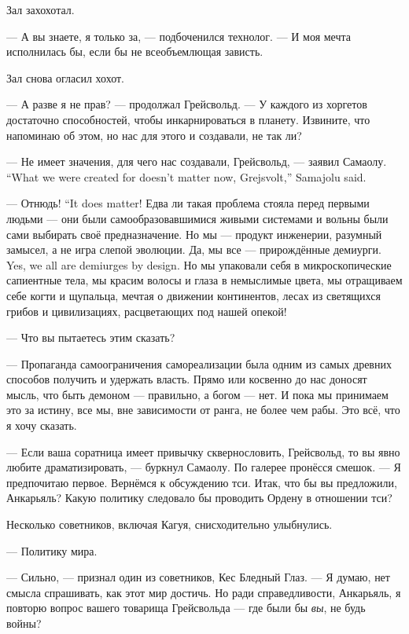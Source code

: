 Зал захохотал.

--- А вы знаете, я только за, --- подбоченился технолог.
--- И моя мечта исполнилась бы, если бы не всеобъемлющая зависть.

Зал снова огласил хохот.

--- А разве я не прав? --- продолжал Грейсвольд.
--- У каждого из хоргетов достаточно способностей, чтобы инкарнироваться в планету.
Извините, что напоминаю об этом, но нас для этого и создавали, не так ли?

{--- Не имеет значения, для чего нас создавали, Грейсвольд, --- заявил Самаолу.}
{``What we were created for doesn't matter now, Grejsvolt,'' Samajolu said.}

{--- Отнюдь!}
{``It does matter!}
Едва ли такая проблема стояла перед первыми людьми --- они были самообразовавшимися живыми системами и вольны были сами выбирать своё предназначение.
Но мы --- продукт инженерии, разумный замысел, а не игра слепой эволюции.
{Да, мы все --- прирождённые демиурги.}
{Yes, we all are demiurges by design.}
Но мы упаковали себя в микроскопические сапиентные тела, мы красим волосы и глаза в немыслимые цвета, мы отращиваем себе когти и щупальца, мечтая о движении континентов, лесах из светящихся грибов и цивилизациях, расцветающих под нашей опекой!

--- Что вы пытаетесь этим сказать?

--- Пропаганда самоограничения самореализации была одним из самых древних способов получить и удержать власть.
Прямо или косвенно до нас доносят мысль, что быть демоном --- правильно, а богом --- нет.
И пока мы принимаем это за истину, все мы, вне зависимости от ранга, не более чем рабы.
Это всё, что я хочу сказать.

--- Если ваша соратница имеет привычку сквернословить, Грейсвольд, то вы явно любите драматизировать, --- буркнул Самаолу.
По галерее пронёсся смешок.
--- Я предпочитаю первое.
Вернёмся к обсуждению тси.
Итак, что бы вы предложили, Анкарьяль?
Какую политику следовало бы проводить Ордену в отношении тси?

Несколько советников, включая Кагуя, снисходительно улыбнулись.

--- Политику мира.

--- Сильно, --- признал один из советников, Кес Бледный Глаз.
--- Я думаю, нет смысла спрашивать, как этот мир достичь.
Но ради справедливости, Анкарьяль, я повторю вопрос вашего товарища Грейсвольда --- где были бы \emph{вы}, не будь войны?

